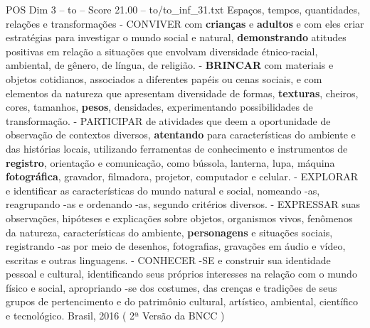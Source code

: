 \begin{textsample}{POS Dim 3 – to – Score 21.00 – to/to\_inf\_31.txt}
Espaços, tempos, quantidades, relações e transformações - CONVIVER com \textbf{crianças} e \textbf{adultos} e com eles criar estratégias para investigar o mundo social e natural, \textbf{demonstrando} atitudes positivas em relação a situações que envolvam diversidade étnico-racial, ambiental, de gênero, de língua, de religião. - \textbf{BRINCAR} com materiais e objetos cotidianos, associados a diferentes papéis ou cenas sociais, e com elementos da natureza que apresentam diversidade de formas, \textbf{texturas}, cheiros, cores, tamanhos, \textbf{pesos}, densidades, experimentando possibilidades de transformação. - PARTICIPAR de atividades que deem a oportunidade de observação de contextos diversos, \textbf{atentando} para características do ambiente e das histórias locais, utilizando ferramentas de conhecimento e instrumentos de \textbf{registro}, orientação e comunicação, como bússola, lanterna, lupa, máquina \textbf{fotográfica}, gravador, filmadora, projetor, computador e celular. - EXPLORAR e identificar as características do mundo natural e social, nomeando -as, reagrupando -as e ordenando -as, segundo critérios diversos. - EXPRESSAR suas observações, hipóteses e explicações sobre objetos, organismos vivos, fenômenos da natureza, características do ambiente, \textbf{personagens} e situações sociais, registrando -as por meio de desenhos, fotografias, gravações em áudio e vídeo, escritas e outras linguagens. - CONHECER -SE e construir sua identidade pessoal e cultural, identificando seus próprios interesses na relação com o mundo físico e social, apropriando -se dos costumes, das crenças e tradições de seus grupos de pertencimento e do patrimônio cultural, artístico, ambiental, científico e tecnológico.
Brasil, 2016 ( 2ª Versão da BNCC )

\end{textsample}
